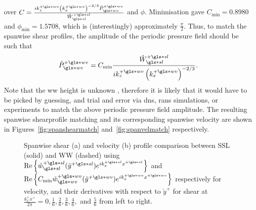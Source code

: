over $C=\frac{ik_z\pw \left( k_x\pw \right) ^{-2 /3}\hat{P}\pw\ww }{\hat{W}\ps\ssl}$ and $\phi $. Minimisation gave $C_\text{min} = 0.8980$ and $\phi _\text{min} =1.5708$, which is (interestingly) approximately $\frac{\pi}{2}$. Thus, to match the spanwise shear profiles, the amplitude of the periodic pressure field should be such that
\begin{equation}
	\hat{P}\pw\ww=C_\text{min} \frac{\hat{W}\ps\ssl}{ik_z\pw \left(k_x\pw\right)^{-2 /3}}\label{eq:phtselect}
.\end{equation}
Note that the \gls{ww} height is unknown , therefore it is likely that it would have to be picked by guessing, and trial and error via \gls{dns}, \gls{rans} simulations, or experiments to match the above periodic pressure field amplitude. The resulting spanwise shearprofile matching and its corresponding spanwise velocity are shown in Figures~\ref{fig:spanshearmatch} and~\ref{fig:spanvelmatch} respectively.

\begin{figure}[htbp]
	\centering
	\caption[Spanwise shear and velocity profile comparison between SSL and WW]{Spanwise shear (a) and velocity (b) profile comparison between SSL (solid) and WW (dashed) using $\Re \left\{ \check{w}\ps\ssl (\check{y}\ps)e ^{ik_x\ps x\ps} \right\} $ and $\Re \left\{ C_\text{min} \check{w}\pw\ww (\check{y}\pw)e ^{ik_x\pw x\pw} \right\} $ respectively for velocity, and their derivatives with respect to $\check{y}^{+}$ for shear at $\frac{k_x^{+}x^{+}}{2\pi}=0, \frac{1}{6}, \frac{2}{6}, \frac{3}{6}, \frac{4}{6},$ and $\frac{5}{6}$ from left to right.}
	\label{fig:spanmatch}
\end{figure}

